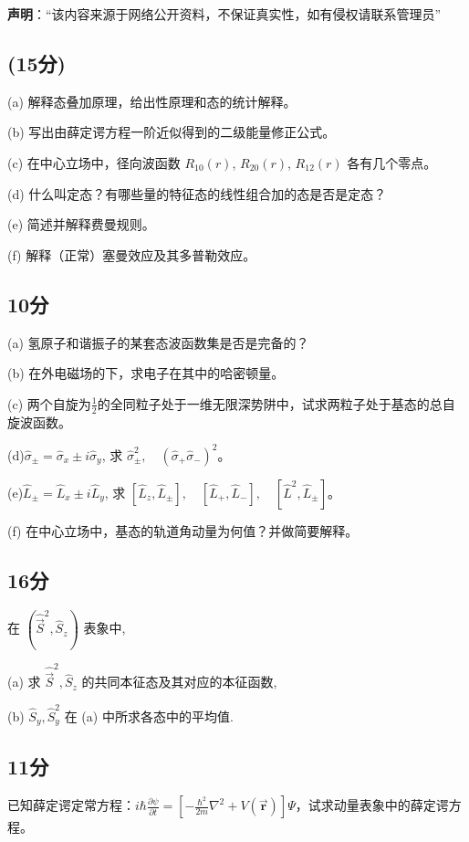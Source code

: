 
\textbf{声明}：“该内容来源于网络公开资料，不保证真实性，如有侵权请联系管理员”

\subsection{(15分)}

(a) 解释态叠加原理，给出性原理和态的统计解释。

(b) 写出由薛定谔方程一阶近似得到的二级能量修正公式。

(c) 在中心立场中，径向波函数 $R_{10}(r)$, $R_{20}(r)$, $R_{12}(r)$ 各有几个零点。

(d) 什么叫定态？有哪些量的特征态的线性组合加的态是否是定态？

(e) 简述并解释费曼规则。

(f) 解释（正常）塞曼效应及其多普勒效应。

\subsection{10分}

(a) 氢原子和谐振子的某套态波函数集是否是完备的？

(b) 在外电磁场的下，求电子在其中的哈密顿量。

(c) 两个自旋为$\frac{1}{2}$的全同粒子处于一维无限深势阱中，试求两粒子处于基态的总自旋波函数。

(d)$\hat{\sigma}_{\pm} = \hat{\sigma}_x \pm i \hat{\sigma}_y
$, 求 $\hat{\sigma}_{\pm}^2,\quad (\hat{\sigma}_+ \hat{\sigma}_-)^2$。

(e)$\hat{L}_{\pm} = \hat{L}_x \pm i \hat{L}_y$,  求 $[\hat{L}_z, \hat{L}_\pm],\quad [\hat{L}_+,\hat{L}_-], \quad [\hat{L}^2, \hat{L}_\pm]$。

(f) 在中心立场中，基态的轨道角动量为何值？并做简要解释。


\subsection{16分}
在 $(\hat{\vec S}^2, \hat{S}_z)$ 表象中,

(a) 求 $\hat{\vec S}^2, \hat{S}_z$ 的共同本征态及其对应的本征函数,

(b) $\hat{S}_y, \hat{S}_y^2$ 在 (a) 中所求各态中的平均值.

\subsection{11分}
已知薛定谔定常方程：$i\hbar \frac{\partial \psi}{\partial t} = \left[ -\frac{\hbar^2}{2m} \nabla^2 + V(\mathbf{\vec r}) \right] \Psi$，试求动量表象中的薛定谔方程。

